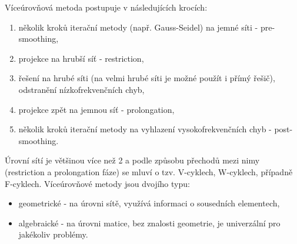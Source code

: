 \documentclass[a4paper,12pt]{report}
\theoremstyle{remark}
\begin{document}
Víceúrovňová metoda postupuje v následujících krocích:
\begin{enumerate}
	\item několik kroků iterační metody (např. Gauss-Seidel) na jemné síti - pre-smoothing,
	\item projekce na hrubší síť - restriction,
	\item řešení na hrubé síti (na velmi hrubé síti je možné použít i přímý řešič), odstranění nízkofrekvenčních chyb,
	\item projekce zpět na jemnou síť - prolongation,
	\item několik kroků iterační metody na vyhlazení vysokofrekvenčních chyb - post-smoothing.
\end{enumerate}

Úrovní sítí je většinou více než 2 a podle způsobu přechodů mezi nimy (restriction a prolongation fáze) se mluví o tzv. V-cyklech, W-cyklech, případně F-cyklech. Víceúrovňové metody jsou dvojího typu:
\begin{itemize}
	\item geometrické - na úrovni sítě, využívá informaci o sousedních elementech,
	\item algebraické - na úrovni matice, bez znalosti geometrie, je univerzální pro jakékoliv problémy.
\end{itemize}
	

	
		
\end{document}
